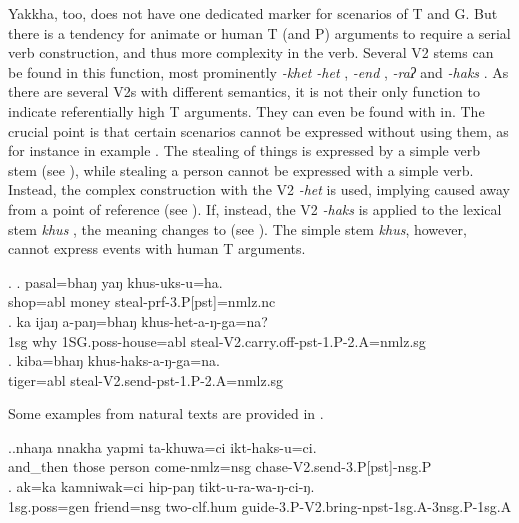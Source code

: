 \largerpage
Yakkha, too, does not have one dedicated marker for  scenarios of T and G. But there is a tendency for animate or human T (and P) arguments to require a serial verb construction, and thus more complexity in the verb. Several V2 stems  can be found in this function, most prominently \emph{-khet \ti -het} , \emph{-end} , \emph{-raʔ}  and \emph{-haks} . As there are several V2s  with different semantics, it is not their only function to indicate referentially high T arguments. They can even be found with in. The crucial point is that certain scenarios cannot be expressed without using them, as for instance in example \Next. The stealing of things is expressed by a simple verb stem (see \Next[a]), while stealing a person cannot be expressed with a simple verb. Instead, the complex construction with the V2 \emph{-het}  is used, implying caused  away from a point of reference  (see \Next[b]). If, instead, the V2 \emph{-haks}  is applied to the lexical stem \emph{khus} , the meaning changes to  (see \Next[c]). The simple stem \emph{khus}, however, cannot express events with human T arguments.


\ex. \ag. pasal=bhaŋ yaŋ khus-uks-u=ha.\\
		shop{\sc =abl} money steal{\sc -prf-3.P[pst]=nmlz.nc}	\\
 	\bg.  ka ijaŋ a-paŋ=bhaŋ khus-het-a-ŋ-ga=na?\\ 
	{\sc 1sg} why {\sc 1SG.poss-}house{\sc =abl} steal{\sc -V2.carry.off-pst-1.P-2.A=nmlz.sg}		\\
	\bg.  kiba=bhaŋ khus-haks-a-ŋ-ga=na.\\ 
tiger{\sc =abl} steal{\sc -V2.send-pst-1.P-2.A=nmlz.sg}		\\
	

Some examples from natural texts are provided in \Next.	

\ex.\ag.nhaŋa   nnakha yapmi ta-khuwa=ci       ikt-haks-u=ci.\\
and\_then those person come{\sc -nmlz=nsg} chase{\sc -V2.send-3.P[pst]-nsg.P}\\
 
 	\bg. ak=ka  kamniwak=ci   hip-paŋ tikt-u-ra-wa-ŋ-ci-ŋ.\\
{\sc 1sg.poss=gen} friend{\sc =nsg} two{\sc -clf.hum} guide{\sc -3.P-V2.bring-npst-1sg.A-3nsg.P-1sg.A}\\
	  
	
